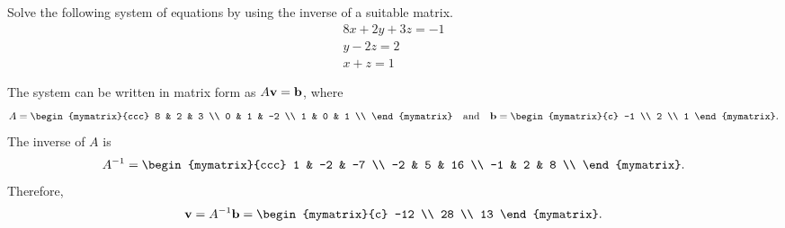 \begin{ex}
  Solve the following system of equations by using the inverse of a suitable matrix.
  \begin{equation*}
    \begin{array}{c}
      8x + 2y + 3z = -1 \\
      y - 2z = 2 \\
      x + z = 1
    \end{array}
  \end{equation*}
  \begin{sol}
    The system can be written in matrix form as $A\vect{v}=\vect{b}$,
    where
    \begin{equation*}
      A = \begin{mymatrix}{ccc}
        8 & 2 & 3 \\
        0 & 1 & -2 \\
        1 & 0 & 1 \\
      \end{mymatrix}
      \quad\mbox{and}\quad
      \vect{b} = \begin{mymatrix}{c} -1 \\ 2 \\ 1 \end{mymatrix}.
    \end{equation*}
    The inverse of $A$ is
    \begin{equation*}
      A^{-1} = \begin{mymatrix}{ccc}
        1 & -2 & -7 \\
        -2 & 5 & 16 \\
        -1 & 2 & 8 \\
      \end{mymatrix}.
    \end{equation*}
    Therefore,
    \begin{equation*}
      \vect{v} = A^{-1}\vect{b} =
      \begin{mymatrix}{c} -12 \\ 28 \\ 13 \end{mymatrix}.
    \end{equation*}
  \end{sol}
\end{ex}
